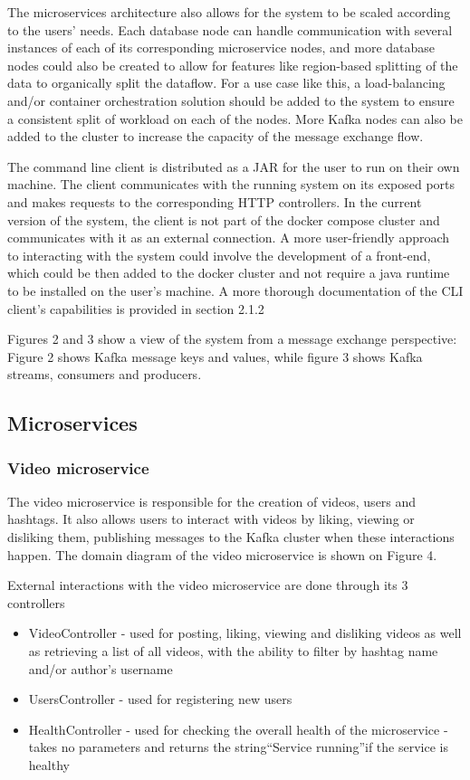 \documentclass[parskip=full]{article}
\begin{document}
    The microservices architecture also allows for the system to be scaled according to the users' needs.
    Each database node can handle communication with several instances of each of its corresponding microservice nodes, and more database nodes could also be created to allow for features like region-based splitting of the data to organically split the dataflow.
    For a use case like this, a load-balancing and/or container orchestration solution should be added to the system to ensure a consistent split of workload on each of the nodes.
    More Kafka nodes can also be added to the cluster to increase the capacity of the message exchange flow.

    The command line client is distributed as a JAR for the user to run on their own machine.
    The client communicates with the running system on its exposed ports and makes requests to the corresponding HTTP controllers.
    In the current version of the system, the client is not part of the docker compose cluster and communicates with it as an external connection.
    A more user-friendly approach to interacting with the system could involve the development of a front-end, which could be then added to the docker cluster and not require a java runtime to be installed on the user's machine.
    A more thorough documentation of the CLI client's capabilities is provided in section 2.1.2

    Figures 2 and 3 show a view of the system from a message exchange perspective: Figure 2 shows Kafka message keys and values, while figure 3 shows Kafka streams, consumers and producers.

    \pagebreak
    \subsection{Microservices}
    \subsubsection{Video microservice}
    The video microservice is responsible for the creation of videos, users and hashtags.
    It also allows users to interact with videos by liking, viewing or disliking them, publishing messages to the Kafka cluster when these interactions happen.
    The domain diagram of the video microservice is shown on Figure 4.

    External interactions with the video microservice are done through its 3 controllers

    \begin{itemize}
        \item VideoController - used for posting, liking, viewing and disliking videos as well as retrieving a list of all videos, with the ability to filter by hashtag name and/or author's username
        \item UsersController - used for registering new users
        \item HealthController - used for checking the overall health of the microservice - takes no parameters and returns the string``Service running''if the service is healthy
    \end{itemize}
\end{document}

